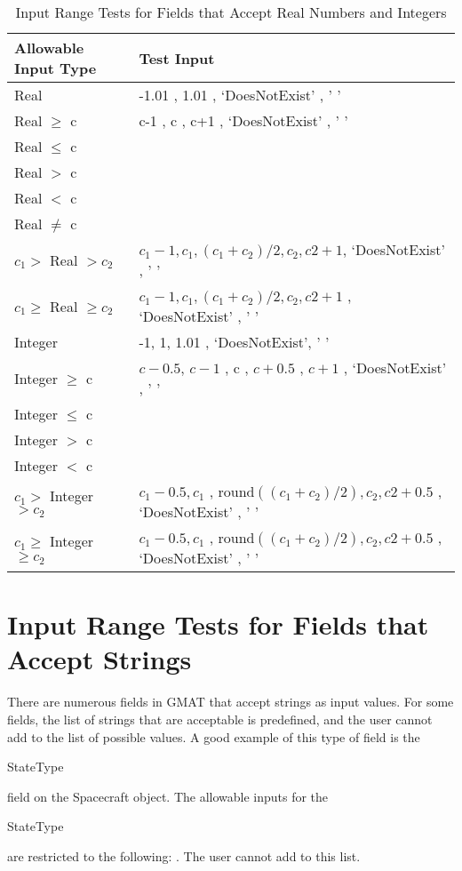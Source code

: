 \documentclass[10 pt]{book}
\newcommand{\st}[1]{\begin{ttfamily}#1\end{ttfamily}}
\begin{document}
\begin{table}[h]
    \centering \caption{Input Range Tests for Fields that Accept Real
    Numbers and Integers}
    \begin{tabular}{p{1.75 in} |p{4.0 in} }
    \hline\hline
    Allowable Input Type & Test Input \\
    \hline
    Real  & -1.01 , 1.01 , `DoesNotExist' , ' '\\
    \hline
    Real $\geq$ c & c-1 , c , c+1 , `DoesNotExist' , ' '\\
    Real $\leq$ c & \\
    Real $>$ c & \\
    Real $<$ c & \\
    Real $\neq$ c & \\
    \hline
    $ c_1 > $ Real $>  c_2$  & $c_1-1 , c_1 , (c_1 + c_2)/2 , c_2 , c2+1$, `DoesNotExist' , ' '\\
    $ c_1 \geq $ Real $\geq c_2$  & $c_1-1 , c_1 , (c_1 + c_2)/2 , c_2 , c2+1$ , `DoesNotExist' , ' '\\
    \hline
    Integer  & -1, 1, 1.01 , `DoesNotExist', ' '\\
    \hline
    Integer $\geq$ c & $c- 0.5$, $c - 1$ , c , $c + 0.5$ , $c + 1$ , `DoesNotExist' , ' '\\
    Integer $\leq$ c & \\
    Integer $>$ c & \\
    Integer $<$ c &  \\
    \hline
    $ c_1 > $ Integer $>  c_2$  & $c_1- 0.5 , c_1$ , round$( (c_1 + c_2)/2) , c_2, c2+0.5$ , `DoesNotExist' , ' '\\
    $ c_1 \geq $ Integer $\geq c_2$  & $c_1-0.5 , c_1$ , round$( (c_1 + c_2)/2) , c_2 , c2+0.5$ , `DoesNotExist' , ' '\\
    \hline
    \end{tabular} \label{Table:NumericInputTests}
\end{table}

\section{Input Range Tests for Fields that Accept Strings }

There are numerous fields in GMAT that accept strings as input
values.  For some fields, the list of strings that are acceptable is
predefined, and the user cannot add to the list of possible values.
A good example of this type of field is the \st{StateType} field on
the Spacecraft object.  The allowable inputs for the \st{StateType}
are restricted to the following:
.  The user cannot add to this
list.
\end{document}
